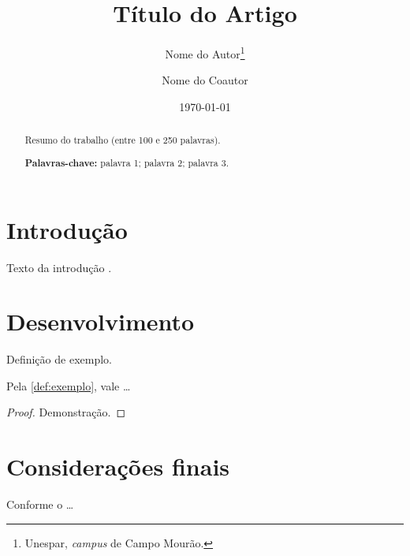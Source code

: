 \documentclass[12pt, a4paper]{article}
\title{Título do Artigo}
\author{%
  Nome do Autor\thanks{Unespar, \textit{campus} de Campo Mourão.}
  \and
  Nome do Coautor%
}
\date{\today}
\begin{document}
\maketitle

\begin{abstract}
  Resumo do trabalho (entre 100 e 250 palavras).

  \medskip
  \noindent\textbf{Palavras-chave:} palavra 1; palavra 2; palavra 3.
\end{abstract}

\section{Introdução}
\label{sec:introducao}

Texto da introdução \parencite{doCarmo1992}.

\section{Desenvolvimento}
\label{sec:desenvolvimento}

\begin{definition}
  \label{def:exemplo}
  Definição de exemplo.
\end{definition}

\begin{theorem}
  \label{teo:exemplo}
  Pela \cref{def:exemplo}, vale \ldots
\end{theorem}

\begin{proof}
  Demonstração.
\end{proof}

\section{Considerações finais}

Conforme o  \ldots

\printbibliography[title={Referências}]
\end{document}
